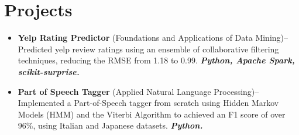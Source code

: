 \documentclass[letterpaper,10pt]{article}
\newcommand{\organization}[4]{
    \vspace{1.5pt}
    \textbf{#1} \hfill{\emph{#2}} \\
    \emph{#3} \hfill{#4} \\
    \vspace{3pt}
}
\newcommand{\toolsused}[1]{
    \vspace{1.5pt}
    \emph{#1}\\
    \vspace{3pt}
}
\newcommand{\pro}[4]{
    \item \textbf{#1} {#2}--{#3} \textbf{\textit{#4}}
}
\newcommand{\prowlink}[4]{
    \item \href{#2}{\textbf{#1}}--{#3} \textbf{\textit{#4}}
}
\newcommand{\bulletsBegin}{
    \vspace{1pt}
    \begin{minipage}{17.6cm}
    \begin{itemize}[leftmargin=0.6cm]
    \setlength\itemsep{-0.1em}
}
\newcommand{\bulletsEnd}{
    \end{itemize}\vspace{0pt}
    \end{minipage}
}
\begin{document}

    \section{Projects}

    
        \bulletsBegin
            \vspace{-3pt}
        \pro{Yelp Rating Predictor}{(Foundations and Applications of Data Mining)}
            {Predicted yelp review ratings using an ensemble of collaborative filtering techniques, reducing the RMSE from 1.18 to 0.99.}
            {Python, Apache Spark, scikit-surprise.}
        \pro{Part of Speech Tagger}{(Applied Natural Language Processing)}
            {Implemented a Part-of-Speech tagger from scratch using Hidden Markov Models (HMM) and the Viterbi Algorithm to achieved an F1 score of over 96\%, using Italian and Japanese datasets.}
            {Python.}
        
        \bulletsEnd

    
\end{document}

